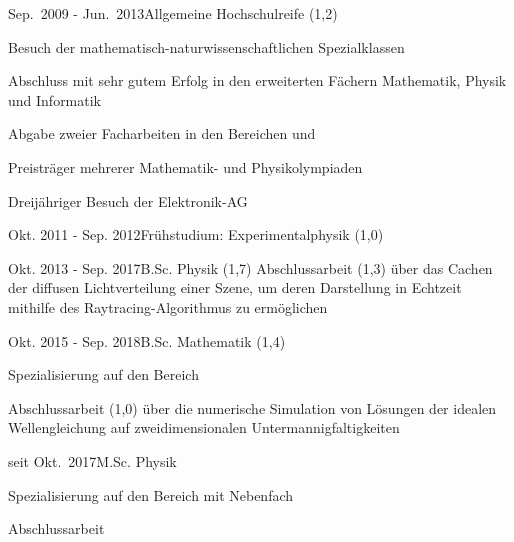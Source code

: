 \documentclass[a4paper,8pt]{cv}
\begin{document}
  \cvHead
      \begin{cvTimeItem}{Sep.~2009 - Jun.~2013}{Allgemeine Hochschulreife (1,2)}
        \begin{cvItemize}
          \item Besuch der mathematisch-naturwissenschaftlichen Spezialklassen
          \item Abschluss mit sehr gutem Erfolg in den erweiterten Fächern Mathematik, Physik und Informatik
          \item Abgabe zweier Facharbeiten in den Bereichen  und 
          \item Preisträger mehrerer Mathematik- und Physikolympiaden
          \item Dreijähriger Besuch der Elektronik-AG
        \end{cvItemize}
      \end{cvTimeItem}

      \begin{cvTimeItem}{Okt. 2011 - Sep. 2012}{Frühstudium: Experimentalphysik (1,0)}
      \end{cvTimeItem}

      \begin{cvTimeItem}{Okt. 2013 - Sep. 2017}{B.Sc. Physik (1,7)}
        Abschlussarbeit  (1,3) über das Cachen der diffusen Lichtverteilung einer Szene, um deren Darstellung in Echtzeit mithilfe des Raytracing-Algorithmus zu ermöglichen
      \end{cvTimeItem}
      \begin{cvTimeItem}{Okt. 2015 - Sep. 2018}{B.Sc. Mathematik (1,4)}
        \begin{cvItemize}
          \item Spezialisierung auf den Bereich 
          \item Abschlussarbeit  (1,0) über die numerische Simulation von Lösungen der idealen Wellengleichung auf zweidimensionalen Untermannigfaltigkeiten
        \end{cvItemize}
      \end{cvTimeItem}
      \begin{cvTimeItem}{seit Okt.~2017}{M.Sc. Physik}
        \begin{cvItemize}
          \item Spezialisierung auf den Bereich  mit Nebenfach 
          \item Abschlussarbeit 
        \end{cvItemize}
      \end{cvTimeItem}
\end{document}

